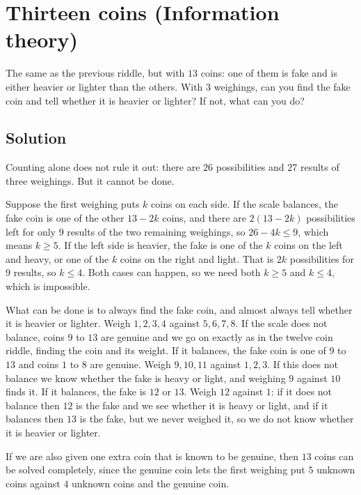 \section {Thirteen coins (Information theory)}

The same as the previous riddle, but with $13$ coins: one of them is fake and is either heavier or lighter than the others.
With $3$ weighings, can you find the fake coin and tell whether it is heavier or lighter?
If not, what can you do?

\subsection{Solution}

Counting alone does not rule it out: there are $26$ possibilities and $27$ results of three weighings. But it cannot be done.

Suppose the first weighing puts $k$ coins on each side.
If the scale balances, the fake coin is one of the other $13-2k$ coins, and there are $2(13-2k)$ possibilities left for only $9$ results of the two remaining weighings,
so $26-4k \le 9$, which means $k \ge 5$.
If the left side is heavier, the fake is one of the $k$ coins on the left and heavy, or one of the $k$ coins on the right and light.
That is $2k$ possibilities for $9$ results, so $k \le 4$.
Both cases can happen, so we need both $k \ge 5$ and $k \le 4$, which is impossible.

What can be done is to always find the fake coin, and almost always tell whether it is heavier or lighter.
Weigh $1,2,3,4$ against $5,6,7,8$.
If the scale does not balance, coins $9$ to $13$ are genuine and we go on exactly as in the twelve coin riddle, finding the coin and its weight.
If it balances, the fake coin is one of $9$ to $13$ and coins $1$ to $8$ are genuine. Weigh $9,10,11$ against $1,2,3$.
If this does not balance we know whether the fake is heavy or light, and weighing $9$ against $10$ finds it.
If it balances, the fake is $12$ or $13$. Weigh $12$ against $1$: if it does not balance then $12$ is the fake and we see whether it is heavy or light,
and if it balances then $13$ is the fake, but we never weighed it, so we do not know whether it is heavier or lighter.

If we are also given one extra coin that is known to be genuine, then $13$ coins can be solved completely, since the genuine coin lets the first weighing
put $5$ unknown coins against $4$ unknown coins and the genuine coin.
